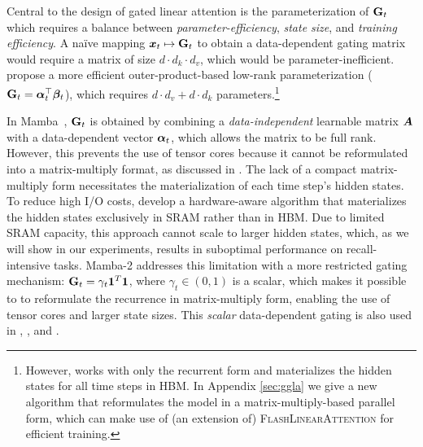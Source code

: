 Central to the design of gated linear attention  is the parameterization of \({\mathbf{G}}_t\) which requires a balance between \textit{parameter-efficiency}, \textit{state size}, 
%
and \textit{training efficiency}.
A na\"{i}ve mapping ${\bm{x}}_t \mapsto {\mathbf{G}}_{t}$ to obtain a data-dependent gating matrix would require a matrix of size $d \cdot d_k \cdot d_v$, which would be parameter-inefficient. \citet{mao-2022-fine} propose a more efficient outer-product-based low-rank parameterization (\({\mathbf{G}}_t = {\bm{\alpha}}_t^{\top} {\bm{\beta}}_t\)), which requires $d \cdot d_v + d  \cdot d_k$ parameters.\footnote{However, \citet{mao-2022-fine} works with only the recurrent form and materializes the hidden states for all time steps in HBM. In Appendix \ref{sec:ggla} we give a new algorithm that reformulates the model in a matrix-multiply-based parallel form, which can make use of (an extension of) \textsc{FlashLinearAttention} for efficient training.}

%
%
%

In Mamba~\cite{Gu2023MambaLS}, \({\mathbf{G}}_t\) is obtained by combining a  \emph{data-independent} learnable matrix \({\bm{A}}\) with a data-dependent vector ${\bm{\alpha}}_t$, which allows the matrix to be full rank. However, this prevents the use of tensor cores because it cannot be reformulated into a matrix-multiply format, as discussed in  \citet{mamba2}. The lack of a compact matrix-multiply form  necessitates the materialization of each time step's hidden states. To reduce high I/O costs, \citet{Gu2023MambaLS} develop a hardware-aware algorithm that materializes the hidden states {exclusively} in  SRAM rather than in HBM. Due to limited SRAM capacity, this approach cannot scale to larger hidden states, which, as we will show in our experiments, results in suboptimal performance on recall-intensive tasks. Mamba-2 \cite{mamba2} addresses this limitation with a more {restricted} gating mechanism: \({\mathbf{G}}_t = \gamma_t \mathbf{1}^T \mathbf{1}\), where \(\gamma_t \in (0,1)\) is a scalar, which makes it possible to to reformulate the recurrence in matrix-multiply form, enabling the use of tensor cores and larger  state sizes. This \emph{scalar} data-dependent gating is also used in \citet{peng2021random}, \citet{Sun2024YouOC}, and \citet{beck2024xlstm}. 

%

%
%
%
%
%
%
%
 
%


